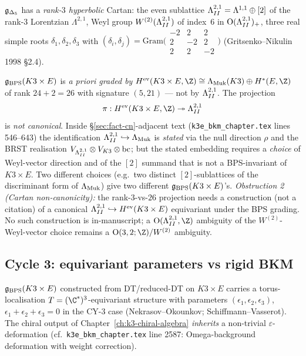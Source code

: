 $\mathfrak{g}_{\Delta_5}$ has a \emph{rank-$3$ hyperbolic} Cartan: the even sublattice
$\Lambda^{2,1}_{II} = \Lambda^{1,1} \oplus [2]$ of the rank-$3$ Lorentzian
$\Lambda^{2,1}$, Weyl group $W^{(2)}(\Lambda^{2,1}_{II})$ of index~$6$ in
$\mathrm{O}(\Lambda^{2,1}_{II})_+$, three real simple roots $\delta_1,
\delta_2, \delta_3$ with
$(\delta_i, \delta_j) = \mathrm{Gram}\bigl(\begin{smallmatrix}-2 &
 2 & 2 \\ 2 & -2 & 2 \\ 2 & 2 & -2 \end{smallmatrix}\bigr)$
(Gritsenko--Nikulin 1998 \S2.4).

$\mathfrak{g}_{\mathrm{BPS}}(K3 \times E)$ is \emph{a priori graded by} $H^{\mathrm{ev}}(K3 \times E,
\Z) \cong \Lambda_\Muk(K3) \oplus H^*(E, \Z)$ of rank
$24 + 2 = 26$ with signature $(5, 21)$ --- not by $\Lambda^{2,1}_{II}$.
The projection
\[
  \pi : H^{\mathrm{ev}}(K3 \times E, \Z) \twoheadrightarrow
  \LambdaII
\]
is \emph{not canonical}. Inside
\S\ref{sec:fact-cn}-adjacent text (\texttt{k3e\_bkm\_chapter.tex}
lines 546--643) the identification
$\Lambda^{2,1}_{II} \hookrightarrow \Lambda_{\mathrm{Muk}}$ is \emph{stated} via the
null direction $\rho$ and the BRST realisation $V_{\Lambda^{2,1}_{II}}
\otimes V_{K3} \otimes \mathrm{bc}$; but the stated embedding
requires a \emph{choice} of Weyl-vector direction and of the $[2]$
summand that is not a BPS-invariant of $K3 \times E$. Two different
choices (e.g.\ two distinct $[2]$-sublattices of the discriminant
form of $\Lambda_{\mathrm{Muk}}$) give two different $\mathfrak{g}_{\mathrm{BPS}}(K3 \times E)$'s. \emph{Obstruction 2
(Cartan non-canonicity):} the rank-$3$-vs-$26$ projection needs a
construction (not a citation) of a canonical $\Lambda^{2,1}_{II} \hookrightarrow
H^{\mathrm{ev}}(K3 \times E)$ equivariant under the BPS grading. No
such construction is in-manuscript; a $\mathrm{O}(\LambdaII, \Z)$
ambiguity of the $W^{(2)}$-Weyl-vector choice remains a
$\mathrm{O}(3,2;\Z)/W^{(2)}$ ambiguity.

\subsection*{Cycle 3: equivariant parameters vs rigid BKM}

$\mathfrak{g}_{\mathrm{BPS}}(K3 \times E)$ constructed from DT/reduced-DT on $K3 \times E$ carries a
torus-localisation $T = (\C^*)^3$-equivariant structure with
parameters $(\epsilon_1, \epsilon_2, \epsilon_3)$,
$\epsilon_1 + \epsilon_2 + \epsilon_3 = 0$ in the CY-3 case
(Nekrasov--Okounkov; Schiffmann--Vasserot). The chiral output
of Chapter~\ref{ch:k3-chiral-algebra} \textit{inherits} a non-trivial
$\varepsilon$-deformation (cf.\ \texttt{k3e\_bkm\_chapter.tex}
line 2587: Omega-background deformation with weight correction).

